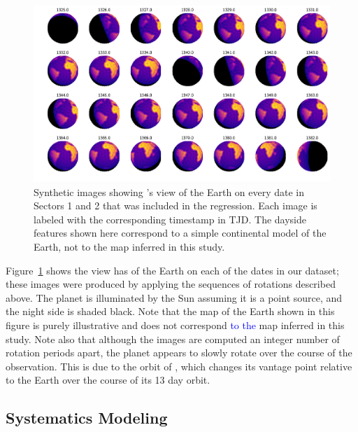 \documentclass[modern]{aastex62}
\newcommand{\edited}[1]{\textcolor{blue}{#1}}
\begin{document}
\begin{figure}[t!]
    \begin{centering}
    \includegraphics[width=\linewidth]{figures/phases.pdf}
    \caption{\label{fig:phases}
             Synthetic images showing \TESS's view of the Earth on every date in 
             Sectors 1 and 2 that was included in the regression. Each image 
             is labeled with the corresponding timestamp in TJD. 
             The dayside features shown here correspond to a simple continental
             model of the Earth, not to the map inferred in this study.
             }
    \end{centering}
\end{figure}

Figure~\ref{fig:phases} shows the view \TESS has of the Earth on each of the dates
in our dataset; these images were produced by applying the sequences of rotations
described above. The planet is illuminated by the Sun assuming it is a point source,
and the night side is shaded black. Note that the map of the Earth shown in this figure is
purely illustrative and does not correspond \edited{to the} map inferred in this study.
Note also that although the images are computed an integer number of rotation periods
apart, the planet appears to slowly rotate over the course of the observation.
This is due to the orbit of \TESS, which changes its vantage point relative
to the Earth over the course of its 13 day orbit.

\subsection{Systematics Modeling}
\label{sec:systematics}
\end{document}
